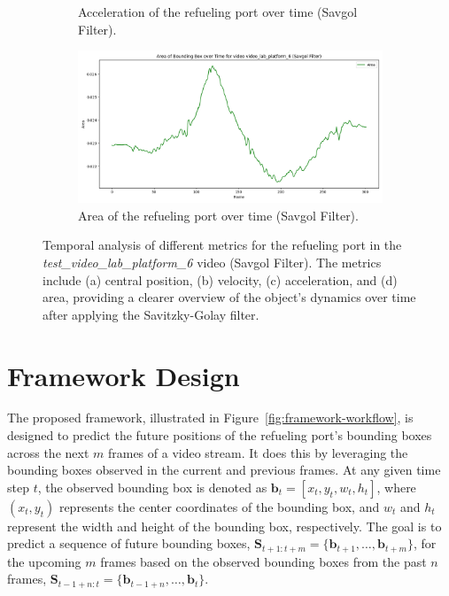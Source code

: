 \documentclass[12pt,oneside]{book} %
\begin{document}
\begin{figure}[H]
\begin{subfigure}[t]{0.45\textwidth}
        \caption{Acceleration of the refueling port over time (Savgol Filter).}
        \label{fig:acceleration-test-video_lab_platform_6-savgol}
    \end{subfigure}
    \hfill
    \begin{subfigure}[t]{0.45\textwidth}
        \includegraphics[width=\textwidth]{figures/bbox_metrics/video_lab_platform_6 (Savgol Filter)_area.png}
        \caption{Area of the refueling port over time (Savgol Filter).}
        \label{fig:size-test-video_lab_platform_6-savgol}
    \end{subfigure}
    \caption{Temporal analysis of different metrics for the refueling port in the \textit{test\_video\_lab\_platform\_6} video (Savgol Filter). The metrics include (a) central position, (b) velocity, (c) acceleration, and (d) area, providing a clearer overview of the object's dynamics over time after applying the Savitzky-Golay filter.}
    \label{fig:bbox-metrics-test-video_lab_platform_6-savgol}
\end{figure}

\newpage
\section{Framework Design}
The proposed framework, illustrated in Figure~\ref{fig:framework-workflow}, is
designed to predict the future positions of the refueling port’s bounding boxes
across the next \(m\) frames of a video stream. It does this by leveraging the
bounding boxes observed in the current and previous frames. At any given time
step \(t\), the observed bounding box is denoted as \(\mathbf{b}_t = [x_t, y_t,
w_t, h_t]\), where \((x_t, y_t)\) represents the center coordinates of the
bounding box, and \(w_t\) and \(h_t\) represent the width and height of the
bounding box, respectively. The goal is to predict a sequence of future
bounding boxes, \(\mathbf{S}_{t+1:t+m} = \{\mathbf{b}_{t+1}, \dots,
\mathbf{b}_{t+m}\}\), for the upcoming \(m\) frames based on the observed
bounding boxes from the past \(n\) frames, \(\mathbf{S}_{t-1+n:t} =
\{\mathbf{b}_{t-1+n}, \dots, \mathbf{b}_{t}\}\). 
\end{document}
